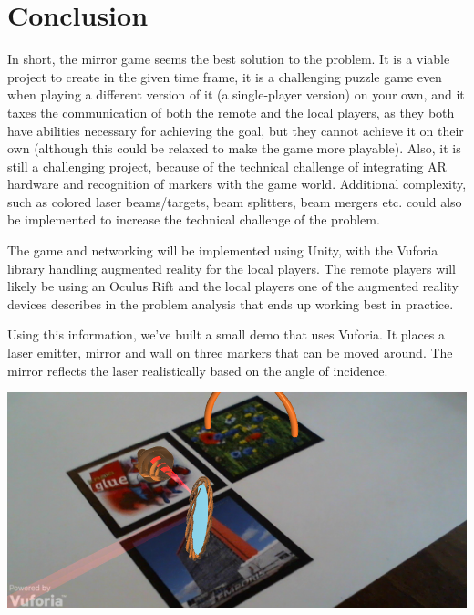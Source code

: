 \chapter{Conclusion} \label{cha:conclusion}
In short, the mirror game seems the best solution to the problem. It is a viable project
to create in the given time frame, it is a challenging puzzle game even when playing a 
different version of it (a single-player version) on your own, and it taxes the communication
of both the remote and the local players, as they both have abilities necessary for
achieving the goal, but they cannot achieve it on their own (although this could be relaxed
to make the game more playable). Also, it is still a challenging project, because of the
technical challenge of integrating AR hardware and recognition of markers with the game
world. Additional complexity, such as colored laser beams/targets, beam splitters, beam mergers
etc. could also be implemented to increase the technical challenge of the problem.

The game and networking will be implemented using Unity, with the Vuforia library
handling augmented reality for the local players. The remote players will likely
be using an Oculus Rift and the local players one of the augmented reality devices
describes in the problem analysis that ends up working best in practice.

Using this information, we've built a small demo that uses Vuforia. It places
a laser emitter, mirror and wall on three markers that can be moved around. The
mirror reflects the laser realistically based on the angle of incidence.

\includegraphics[scale=0.7]{demo.png}